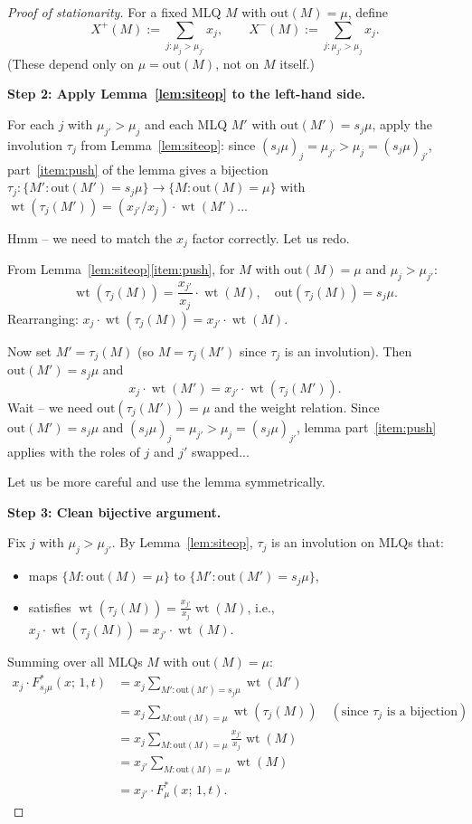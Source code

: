 \documentclass[12pt]{article}
\theoremstyle{definition}
\DeclareMathOperator{\wt}{wt}
\begin{document}
\begin{proof}[Proof of stationarity]
For a fixed MLQ $M$ with $\text{out}(M) = \mu$, define
\[
  X^+(M) := \sum_{j : \mu_j > \mu_{j'}} x_j, \qquad
  X^-(M) := \sum_{j : \mu_{j'} > \mu_j} x_j.
\]
(These depend only on $\mu = \text{out}(M)$, not on $M$ itself.)

\textbf{Step 2: Apply Lemma~\ref{lem:siteop} to the left-hand side.}

For each $j$ with $\mu_{j'} > \mu_j$ and each MLQ $M'$ with
$\text{out}(M') = s_j\mu$, apply the involution $\tau_j$ from
Lemma~\ref{lem:siteop}: since $(s_j\mu)_j = \mu_{j'} > \mu_j = (s_j\mu)_{j'}$,
part~\ref{item:push} of the lemma gives a bijection $\tau_j : \{M' :
\text{out}(M') = s_j\mu\} \to \{M : \text{out}(M) = \mu\}$ with
$\wt(\tau_j(M')) = (x_{j'}/x_j) \cdot \wt(M')$...

Hmm -- we need to match the $x_j$ factor correctly.  Let us redo.

From Lemma~\ref{lem:siteop}\ref{item:push}, for $M$ with $\text{out}(M) = \mu$
and $\mu_j > \mu_{j'}$:
\[
  \wt(\tau_j(M)) = \frac{x_{j'}}{x_j} \cdot \wt(M),
  \quad \text{out}(\tau_j(M)) = s_j\mu.
\]
Rearranging: $x_j \cdot \wt(\tau_j(M)) = x_{j'} \cdot \wt(M)$.

Now set $M' = \tau_j(M)$ (so $M = \tau_j(M')$ since $\tau_j$ is an
involution).  Then $\text{out}(M') = s_j\mu$ and
\[
  x_j \cdot \wt(M') = x_{j'} \cdot \wt(\tau_j(M')).
\]
Wait -- we need $\text{out}(\tau_j(M')) = \mu$ and the weight relation.  Since
$\text{out}(M') = s_j\mu$ and $(s_j\mu)_j = \mu_{j'} > \mu_j = (s_j\mu)_{j'}$,
lemma part~\ref{item:push} applies with the roles of $j$ and $j'$ swapped...

Let us be more careful and use the lemma symmetrically.

\medskip
\textbf{Step 3: Clean bijective argument.}

Fix $j$ with $\mu_j > \mu_{j'}$.  By Lemma~\ref{lem:siteop},
$\tau_j$ is an involution on MLQs that:
\begin{itemize}
\item maps $\{M : \text{out}(M) = \mu\}$ to $\{M' : \text{out}(M') = s_j\mu\}$,
\item satisfies $\wt(\tau_j(M)) = \frac{x_{j'}}{x_j} \wt(M)$, i.e.,
  $x_j \cdot \wt(\tau_j(M)) = x_{j'} \cdot \wt(M)$.
\end{itemize}

Summing over all MLQs $M$ with $\text{out}(M) = \mu$:
\begin{align*}
  x_j \cdot F^*_{s_j\mu}(x;\,1,t)
  &= x_j \sum_{M' : \text{out}(M')=s_j\mu} \wt(M') \\
  &= x_j \sum_{M : \text{out}(M)=\mu} \wt(\tau_j(M))
    \quad (\text{since $\tau_j$ is a bijection})\\
  &= x_j \sum_{M : \text{out}(M)=\mu} \frac{x_{j'}}{x_j} \wt(M) \\
  &= x_{j'} \sum_{M : \text{out}(M)=\mu} \wt(M) \\
  &= x_{j'} \cdot F^*_\mu(x;\,1,t).
\end{align*}


\end{proof}
\end{document}
